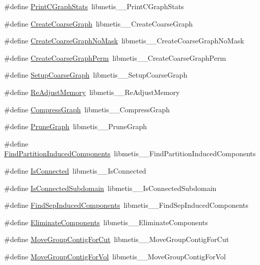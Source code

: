 \begin{DoxyCompactItemize}
\item 
\#define \hyperlink{a00957_a41799787ea9a107154b88d78ec02aa35}{Print\+C\+Graph\+Stats}~libmetis\+\_\+\+\_\+\+Print\+C\+Graph\+Stats
\item 
\#define \hyperlink{a00957_a8d4331c7d328f4b7121e6d2d4dc49fd3}{Create\+Coarse\+Graph}~libmetis\+\_\+\+\_\+\+Create\+Coarse\+Graph
\item 
\#define \hyperlink{a00957_a861678cceb8d18e08831a353a9baace7}{Create\+Coarse\+Graph\+No\+Mask}~libmetis\+\_\+\+\_\+\+Create\+Coarse\+Graph\+No\+Mask
\item 
\#define \hyperlink{a00957_aa9b3143360e89b01294d8c1e5be37ac8}{Create\+Coarse\+Graph\+Perm}~libmetis\+\_\+\+\_\+\+Create\+Coarse\+Graph\+Perm
\item 
\#define \hyperlink{a00957_a25c6276da5c4decb85b3ac881c9bdbb9}{Setup\+Coarse\+Graph}~libmetis\+\_\+\+\_\+\+Setup\+Coarse\+Graph
\item 
\#define \hyperlink{a00957_a6846b86e4927b91dcfd70b586f10a1c3}{Re\+Adjust\+Memory}~libmetis\+\_\+\+\_\+\+Re\+Adjust\+Memory
\item 
\#define \hyperlink{a00957_a0beecd7ed2fea0a47127b167a55549b4}{Compress\+Graph}~libmetis\+\_\+\+\_\+\+Compress\+Graph
\item 
\#define \hyperlink{a00957_aa4a32a542aeee098c455dbbe817cf788}{Prune\+Graph}~libmetis\+\_\+\+\_\+\+Prune\+Graph
\item 
\#define \hyperlink{a00957_a6b6ae3476a2d693f115d00ec0b16dd0d}{Find\+Partition\+Induced\+Components}~libmetis\+\_\+\+\_\+\+Find\+Partition\+Induced\+Components
\item 
\#define \hyperlink{a00957_a40dfbca14246b8df86303acbe2931aa8}{Is\+Connected}~libmetis\+\_\+\+\_\+\+Is\+Connected
\item 
\#define \hyperlink{a00957_a838f6922348cf40f63d57fb6ebc0e398}{Is\+Connected\+Subdomain}~libmetis\+\_\+\+\_\+\+Is\+Connected\+Subdomain
\item 
\#define \hyperlink{a00957_abf9c80cf429eb4a3b0536f6f6230199c}{Find\+Sep\+Induced\+Components}~libmetis\+\_\+\+\_\+\+Find\+Sep\+Induced\+Components
\item 
\#define \hyperlink{a00957_a082656bb622a88c34150e56aafdf36f6}{Eliminate\+Components}~libmetis\+\_\+\+\_\+\+Eliminate\+Components
\item 
\#define \hyperlink{a00957_ac68ca077525541d22a5fd669092b09f9}{Move\+Group\+Contig\+For\+Cut}~libmetis\+\_\+\+\_\+\+Move\+Group\+Contig\+For\+Cut
\item 
\#define \hyperlink{a00957_a2a3fa3284c8ffca1e09e06540543971b}{Move\+Group\+Contig\+For\+Vol}~libmetis\+\_\+\+\_\+\+Move\+Group\+Contig\+For\+Vol

\end{DoxyCompactItemize}
